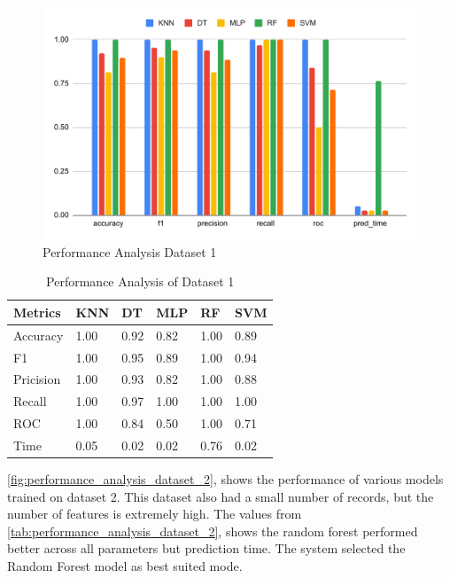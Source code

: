 \begin{figure}[ht]
    \centering
    \includegraphics[width=0.9\columnwidth]{media/sec04/dataset_1_performance_evaluation.pdf}
    \caption{Performance Analysis Dataset 1}
    \label{fig:performance_analysis_dataset_1}
\end{figure}

\begin{table}[ht]
\caption{Performance Analysis of Dataset 1}\label{tab:performance_analysis_dataset_1}
\begin{tabular*}{\tblwidth}{@{}LLLLLL@{}}
\toprule
Metrics & KNN & DT & MLP & RF & SVM \\ %
\midrule
Accuracy & 1.00 & 0.92 & 0.82 & 1.00 & 0.89 \\
F1 & 1.00 & 0.95 & 0.89 & 1.00 & 0.94 \\
Pricision & 1.00 & 0.93 & 0.82 & 1.00 & 0.88 \\
Recall & 1.00 & 0.97 & 1.00 & 1.00 & 1.00 \\
ROC & 1.00 & 0.84 & 0.50 & 1.00 & 0.71 \\
Time & 0.05 & 0.02 & 0.02 & 0.76 & 0.02 \\
\bottomrule
\end{tabular*}
\end{table}

\autoref{fig:performance_analysis_dataset_2}, shows the performance of various models trained on dataset 2. This dataset also had a small number of records, but the number of features is extremely high. The values from \autoref{tab:performance_analysis_dataset_2}, shows the random forest performed better across all parameters but prediction time. The system selected the Random Forest model as best suited mode.

